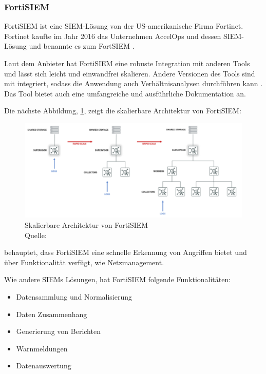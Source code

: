 \subsubsection{FortiSIEM}
FortiSIEM ist eine \gls{SIEM}-Lösung von der US-amerikanische Firma Fortinet. Fortinet kaufte im Jahr 2016 das Unternehmen AccelOps und dessen \gls{SIEM}-Lösung und benannte es zum FortSIEM \citep{Fortinet_Press}. 

Laut dem Anbieter hat FortiSIEM eine robuste Integration mit anderen Tools und lässt sich leicht und einwandfrei skalieren. Andere Versionen des Tools sind mit  integriert, sodass die Anwendung auch Verhältnisanalysen durchführen kann \citep{Fortinet_Solutions}. Das Tool bietet auch eine umfangreiche und ausführliche Dokumentation an. 

Die nächste Abbildung, \ref{fig:FortiSIEM}, zeigt die skalierbare Architektur von FortiSIEM:

\begin{figure}[H]
   \centering
   \includegraphics[width=1\textwidth]{assets/2_p7.png}
   \caption[Skalierbare Architektur von FortiSIEM]
   {Skalierbare Architektur von FortiSIEM \\Quelle: \citep{Fortinet_Arch} }
   \label{fig:FortiSIEM}
   \centering
\end{figure}


\newpage 
\citep{Ramires_fortisiem} behauptet, dass FortiSIEM eine schnelle Erkennung von Angriffen bietet und über  Funktionalität verfügt, wie Netzmanagement. 

Wie andere \glspl{SIEM} Lösungen, hat FortiSIEM folgende Funktionalitäten:

\begin{itemize}[noitemsep]
   \item Datensammlung und Normalisierung
   \item Daten Zusammenhang
   \item Generierung von Berichten
   \item Warnmeldungen
   \item Datenauswertung
\end{itemize}

